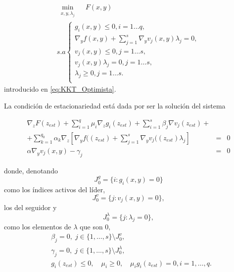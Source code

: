  \begin{equation}
            \begin{array}{l}
                \underset{\substack{x, y, \lambda_j}}{\min} \quad F(x, y)\\
                s.a \left\{ 
                \begin{array}{l}
                    g_i(x, y) \leq 0, i=1\ldots q,\\
                    \nabla_{y} f(x, y) + \sum_{j=1}^{s} \nabla_{y} v_j(x, y) \lambda_j = 0, \\
                    v_j(x, y) \leq 0, j=1\ldots s,\\
                    v_j(x, y)\lambda_j = 0, j=1\ldots s, \\
                    \lambda_j \geq 0, j=1\ldots s.\\
                \end{array}\right.
            \end{array}
        \end{equation} introducido en \ref{eq:KKT_Optimista}.

La condición de estacionariedad está dada por ser la solución del sistema 

$$\begin{matrix}
 \nabla_z F(z_{est}) + \sum_{i=1}^q \mu_i\nabla_z g_i(z_{est}) +\sum_{i=1}^{s} \beta_j\nabla v_j(z_{est}) +\\+\sum_{k=1}^{q_0} \alpha_k\nabla_z[  \nabla_{y} f((z_{est}) +\sum_{j=1}^{s} \nabla_{y} v_j((z_{est}) \lambda_j]&=&0\\
 \alpha  \nabla_{y} v_j(x, y)-\gamma_j&=&0\end{matrix}$$

donde, denotando  \begin{equation}\label{activeg} J_0^g=\{i: g_i(x,y)=0\}\end{equation}    como los índices activos del líder,         $$J_0^v=\{j: v_j(x,y)=0\},$$  los del seguidor y  $$J_0^\lambda=\{j:  \lambda_j=0\},$$ como  los elementos de $\lambda$ que son 0,
  $$\begin{matrix}
        & \beta_j= 0,\; j\in \{1,\ldots, s\}\setminus J_0^v,\\
        &  \gamma_j= 0,\; j\in \{1,\ldots, s\}\setminus J_0^\lambda,  \\
        & g_i(z_{est}) \leq 0, \quad \mu_i \geq 0, \quad \mu_i g_i(z_{est}) = 0, i=1,\ldots, q.
    \end{matrix}$$ 

